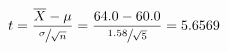 \begin{equation*}
    t=\frac{\overline{X}-\mu}{\sfrac{\sigma}{\sqrt{n}}}
    =\frac{64.0-60.0}{\sfrac{1.58}{\sqrt{5}}}=5.6569
    \end{equation*}